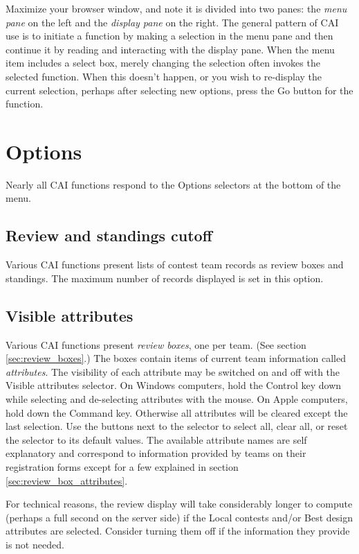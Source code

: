 \documentclass[11pt,letterpaper]{refart}
\def\ui#1{\textsf{#1}}
\begin{document}
Maximize your browser window, and note it is divided into two panes:
the \emph{menu pane} on the left and the \emph{display pane} on the
right. The general pattern of CAI use is to initiate a function by
making a selection in the menu pane and then continue it by reading
and interacting with the display pane. When the menu item includes a
select box, merely changing the selection often invokes the selected
function. When this doesn't happen, or you wish to re-display the
current selection, perhaps after selecting new options, press the
\ui{Go} button for the function.

\section{Options}
Nearly all CAI functions respond to the \ui{Options} selectors at the
bottom of the menu.

\subsection{Review and standings cutoff}
Various CAI functions present lists of contest team records as review
boxes and standings. The maximum number of records displayed is set
in this option.
 
\subsection{Visible attributes}
Various CAI functions present \emph{review boxes}, one per team. (See
section \ref{sec:review_boxes}.) The boxes contain items of current
team information called \emph{attributes}. The visibility of each
attribute may be switched on and off with the \ui{Visible attributes}
selector. On Windows computers, hold the Control key down while
selecting and de-selecting attributes with the mouse. On Apple
computers, hold down the Command key. Otherwise all attributes will be
cleared except the last selection. Use the buttons next to the
selector to select all, clear all, or reset the selector to its
default values. The available attribute names are self explanatory and
correspond to information provided by teams on their registration
forms except for a few explained in section
\ref{sec:review_box_attributes}.

For technical reasons, the review display will take considerably
longer to compute (perhaps a full second on the server side) if the
\ui{Local contests} and/or \ui{Best design} attributes are
selected. Consider turning them off if the information they provide is
not needed.
\end{document}
